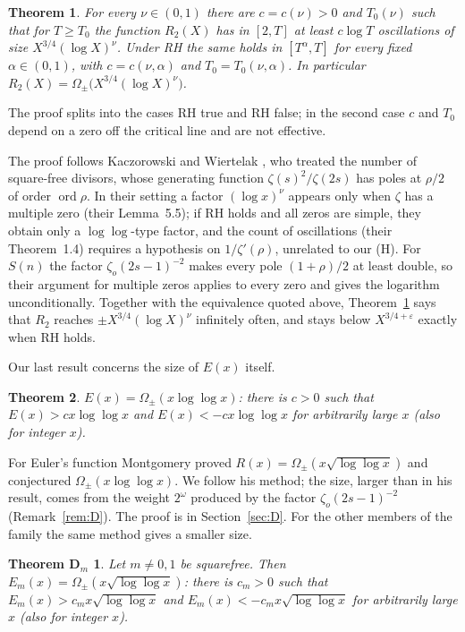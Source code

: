 \documentclass[11pt]{amsart}
\newtheorem{theorem}{Theorem}
\newtheorem*{theoremDm}{Theorem D$_m$}
\theoremstyle{remark}
\newcommand{\zo}{\zeta_{o}}
\begin{document}
\begin{theorem}\label{thm:C}
For every $\nu\in(0,1)$ there are $c=c(\nu)>0$ and $T_0(\nu)$ such that for $T\ge T_0$ the function $R_2(X)$ has in $[2,T]$ at least $c\log T$ oscillations of size $X^{3/4}(\log X)^{\nu}$. Under RH the same holds in $[T^\alpha,T]$ for every fixed $\alpha\in(0,1)$, with $c=c(\nu,\alpha)$ and $T_0=T_0(\nu,\alpha)$. In particular $R_2(X)=\Omega_\pm\big(X^{3/4}(\log X)^\nu\big)$.
\end{theorem}
The proof splits into the cases RH true and RH false; in the second case $c$ and $T_0$ depend on a zero off the critical line and are not effective.

The proof follows Kaczorowski and Wiertelak \cite{KW09}, who treated the number of square-free divisors, whose generating function $\zeta(s)^2/\zeta(2s)$ has poles at $\rho/2$ of order $\operatorname{ord}\rho$. In their setting a factor $(\log x)^\nu$ appears only when $\zeta$ has a multiple zero (their Lemma~5.5); if RH holds and all zeros are simple, they obtain only a $\log\log$-type factor, and the count of oscillations (their Theorem~1.4) requires a hypothesis on $1/\zeta'(\rho)$, unrelated to our (H). For $S(n)$ the factor $\zo(2s-1)^{-2}$ makes every pole $(1+\rho)/2$ at least double, so their argument for multiple zeros applies to every zero and gives the logarithm unconditionally. Together with the equivalence quoted above, Theorem~\ref{thm:C} says that $R_2$ reaches $\pm X^{3/4}(\log X)^\nu$ infinitely often, and stays below $X^{3/4+\varepsilon}$ exactly when RH holds.

Our last result concerns the size of $E(x)$ itself.

\begin{theorem}\label{thm:D}
$E(x)=\Omega_\pm(x\log\log x)$: there is $c>0$ such that $E(x)>cx\log\log x$ and $E(x)<-cx\log\log x$ for arbitrarily large $x$ (also for integer $x$).
\end{theorem}

For Euler's function Montgomery \cite{Mo} proved
$R(x)=\Omega_\pm(x\sqrt{\log\log x})$ and conjectured $\Omega_\pm(x\log\log x)$. We follow his method; the size, larger than in his result, comes from the weight $2^{\omega}$ produced by the factor $\zo(2s-1)^{-2}$ (Remark~\ref{rem:D}). The proof is in Section~\ref{sec:D}. For the other members of the family the same method gives a smaller size.

\begin{theoremDm}
Let $m\neq0,1$ be squarefree. Then $E_m(x)=\Omega_\pm(x\sqrt{\log\log x})$: there is $c_m>0$ such that $E_m(x)>c_mx\sqrt{\log\log x}$ and $E_m(x)<-c_mx\sqrt{\log\log x}$ for arbitrarily large $x$ (also for integer $x$).
\end{theoremDm}
\end{document}

